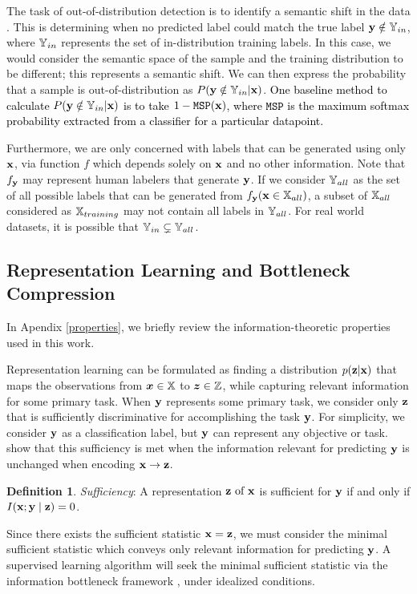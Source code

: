 \documentclass[letterpaper]{article} %
\theoremstyle{plain}
\theoremstyle{definition}
\newtheorem{definition}[theorem]{Definition}
\theoremstyle{remark}
\begin{document}
The task of out-of-distribution detection is to identify a semantic shift in the data \citep{yang2021generalized}. This is determining when no predicted label could match the true label ${\mathbf{y}} \notin {\mathbb{Y}}_{in}$, where ${\mathbb{Y}}_{in}$ represents the set of in-distribution training labels. In this case, we would consider the semantic space of the sample and the training distribution to be different; this represents a semantic shift. We can then express the probability that a sample is out-of-distribution as $P({\mathbf{y}} \notin {\mathbb{Y}}_{in} | {\mathbf{x}})$. \textcolor{black}{One baseline method to calculate $P({\mathbf{y}} \notin {\mathbb{Y}}_{in} | {\mathbf{x}})$ is to take $1 - \texttt{MSP}({\mathbf{x}})$, where $\texttt{MSP}$ is the maximum softmax probability extracted from a classifier for a particular datapoint.}

Furthermore, we are only concerned with labels that can be generated using only ${\mathbf{x}}$, via function $f$ which depends solely on ${\mathbf{x}}$ and no other information. Note that $f_{\mathbf{y}}$ may represent human labelers that generate ${\mathbf{y}}$. If we consider ${\mathbb{Y}}_{all}$ as the set of all possible labels that can be generated from $f_{\mathbf{y}}({\mathbf{x}} \in {\mathbb{X}}_{all})$, a subset of ${\mathbb{X}}_{all}$ considered as ${\mathbb{X}}_{training}$ may not contain all labels in ${\mathbb{Y}}_{all}$. For real world datasets, it is possible that ${\mathbb{Y}}_{in} \subsetneq {\mathbb{Y}}_{all}$.

\subsection{Representation Learning and Bottleneck Compression}
\label{sec:replearning_bottleneck}

In Apendix \ref{properties}, we briefly review the information-theoretic properties used in this work.

Representation learning can be formulated as finding a distribution $p({\mathbf{z}}|{\mathbf{x}})$ that maps the observations from ${\bm{x}} \in {\mathbb{X}}$ to ${\bm{z}} \in {\mathbb{Z}}$, while capturing relevant information for some primary task. When ${\mathbf{y}}$ represents some primary task, we consider only ${\mathbf{z}}$ that is sufficiently discriminative for accomplishing the task ${\mathbf{y}}$. For simplicity, we consider ${\mathbf{y}}$ as a classification label, but ${\mathbf{y}}$ can represent any objective or task. \cite{federici2020learning} show that this sufficiency is met when the information relevant for predicting ${\mathbf{y}}$ is unchanged when encoding ${\mathbf{x}} \rightarrow {\mathbf{z}}$. 

\begin{definition}
    \emph{Sufficiency}: A representation ${\mathbf{z}} \text { of } {\mathbf{x}}$ is sufficient for ${\mathbf{y}}$ if and only if $I({\mathbf{x}} ; {\mathbf{y}} \mid {\mathbf{z}})=0 $.
    \label{definesuff}
\end{definition}
Since there exists the sufficient statistic ${\mathbf{x}}={\mathbf{z}}$, we must consider the minimal sufficient statistic which conveys only relevant information for predicting ${\mathbf{y}}$. A supervised learning algorithm will seek the minimal sufficient statistic via the information bottleneck framework \citep{tishby2015deep}, under idealized conditions. 
\end{document}
